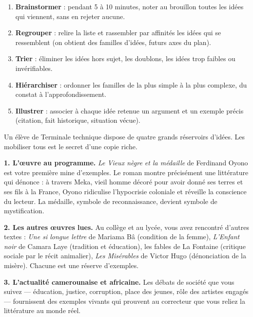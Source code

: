 \documentclass[11pt]{article}
\newcounter{popsec}
\newcounter{popsub}
\newcommand{\courssub}[1]{%
  \stepcounter{popsub}%
  \par\vspace{9pt}\noindent{\popxbold\fontsize{11.5}{13}\selectfont\color{popink}{\color{poporange}\thepopsec.\thepopsub}\hspace{6pt}#1}\par\nopagebreak\vspace{4pt}
}
\begin{document}
\begin{methode}
\begin{enumerate}
\item \textbf{Brainstormer} : pendant 5 à 10 minutes, noter au brouillon toutes les idées qui viennent, sans en rejeter aucune.
\item \textbf{Regrouper} : relire la liste et rassembler par affinités les idées qui se ressemblent (on obtient des familles d'idées, futurs axes du plan).
\item \textbf{Trier} : éliminer les idées hors sujet, les doublons, les idées trop faibles ou invérifiables.
\item \textbf{Hiérarchiser} : ordonner les familles de la plus simple à la plus complexe, du constat à l'approfondissement.
\item \textbf{Illustrer} : associer à chaque idée retenue un argument et un exemple précis (citation, fait historique, situation vécue).
\end{enumerate}
\end{methode}

\courssub{Les sources des idées : où puiser ?}

Un élève de Terminale technique dispose de quatre grands réservoirs d'idées. Les mobiliser tous est le secret d'une copie riche.

\textbf{1. L'œuvre au programme.} \emph{Le Vieux nègre et la médaille} de Ferdinand Oyono est votre première mine d'exemples. Le roman montre précisément une littérature qui dénonce : à travers Meka, vieil homme décoré pour avoir donné ses terres et ses fils à la France, Oyono ridiculise l'hypocrisie coloniale et réveille la conscience du lecteur. La médaille, symbole de reconnaissance, devient symbole de mystification.

\textbf{2. Les autres œuvres lues.} Au collège et au lycée, vous avez rencontré d'autres textes : \emph{Une si longue lettre} de Mariama Bâ (condition de la femme), \emph{L'Enfant noir} de Camara Laye (tradition et éducation), les fables de La Fontaine (critique sociale par le récit animalier), \emph{Les Misérables} de Victor Hugo (dénonciation de la misère). Chacune est une réserve d'exemples.

\textbf{3. L'actualité camerounaise et africaine.} Les débats de société que vous suivez — éducation, justice, corruption, place des jeunes, rôle des artistes engagés — fournissent des exemples vivants qui prouvent au correcteur que vous reliez la littérature au monde réel.
\end{document}
